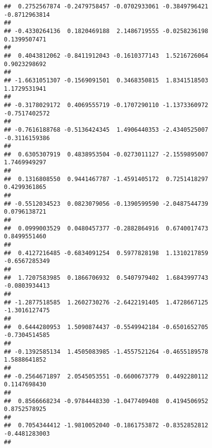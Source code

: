 \documentclass[]{article}
\begin{document}
\begin{verbatim}
##  0.2752567874 -0.2479758457 -0.0702933061 -0.3849796421 -0.8712963814 
##                                                                       
## -0.4330264136  0.1820469188  2.1486719555 -0.0258236198  0.1399507471 
##                                                                       
##  0.4043812062 -0.8411912043 -0.1610377143  1.5216726064  0.9023298692 
##                                                                       
## -1.6631051307 -0.1569091501  0.3468350815  1.8341518503  1.1729531941 
##                                                                       
## -0.3178029172  0.4069555719 -0.1707290110 -1.1373360972 -0.7517402572 
##                                                                       
## -0.7616188768 -0.5136424345  1.4906440353 -2.4340525007 -0.3116159386 
##                                                                       
##  0.6305307919  0.4838953504 -0.0273011127 -2.1559895007  1.7469949297 
##                                                                       
##  0.1316808550  0.9441467787 -1.4591405172  0.7251418297  0.4299361865 
##                                                                       
## -0.5512034523  0.0823079056 -0.1390599590 -2.0487544739  0.0796138721 
##                                                                       
##  0.0999003529  0.0480457377 -0.2882864916  0.6740017473  0.8499551460 
##                                                                       
##  0.4127216485 -0.6834091254  0.5977828198  1.1310217859 -0.6567285349 
##                                                                       
##  1.7207583985  0.1866706932  0.5407979402  1.6843997743 -0.0803934413 
##                                                                       
## -1.2877518585  1.2602730276 -2.6422191405  1.4728667125 -1.3016127475 
##                                                                       
##  0.6444280953  1.5090874437 -0.5549942184 -0.6501652705 -0.7304514585 
##                                                                       
## -0.1392585134  1.4505083985 -1.4557521264 -0.4655189578  1.5888641852 
##                                                                       
## -0.2564671897  2.0545053551 -0.6600673779  0.4492280112  0.1147698430 
##                                                                       
##  0.8566668234 -0.9784448330 -1.0477409408  0.4194506952  0.8752578925 
##                                                                       
##  0.7054344412 -1.9810052040 -0.1861753872 -0.8352852812 -0.4481283003 
##                                                                       

\end{verbatim}
\end{document}
